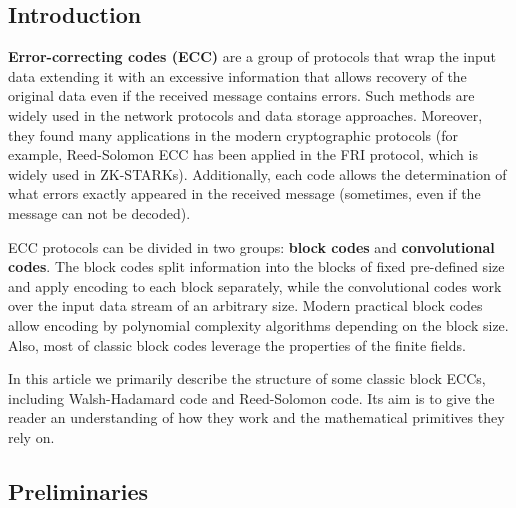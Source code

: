 \documentclass[../lecture-notes.tex]{subfiles}
\begin{document}
\subsection{Introduction}
\textbf{Error-correcting codes (ECC)} are a group of protocols that wrap the input data extending it with an excessive 
information that allows recovery of the original data even if the received message contains errors. Such methods are 
widely used in the network protocols and data storage approaches. Moreover, they found many applications in the modern 
cryptographic protocols (for example, Reed-Solomon ECC has been applied in the FRI protocol, which is widely used in 
ZK-STARKs). Additionally, each code allows the determination of what errors exactly appeared in the received message 
(sometimes, even if the message can not be decoded).

ECC protocols can be divided in two groups: \textbf{block codes} and \textbf{convolutional codes}. The block codes 
split information into the blocks of fixed pre-defined size and apply encoding to each block separately, while the 
convolutional codes work over the input data stream of an arbitrary size. Modern practical block codes allow encoding 
by polynomial complexity algorithms depending on the block size. Also, most of classic block codes leverage the 
properties of the finite fields.

In this article we primarily describe the structure of some classic block ECCs, including Walsh-Hadamard code and 
Reed-Solomon code. Its aim is to give the  reader an understanding of how they work and the mathematical primitives 
they rely on.

\subsection{Preliminaries}
\end{document}
